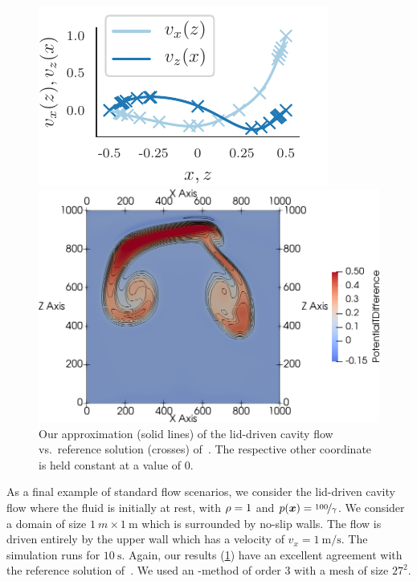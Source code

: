 \documentclass[runningheads]{llncs}
\begin{document}
\begin{figure}[tb]
\centering
  \begin{minipage}[t]{.473\textwidth}
    \centering
    \includegraphics{paper_lid_driven_cavity}
    \caption{\label{fig:cavity-flow}Our approximation (solid lines) of the lid-driven cavity flow vs.\ reference solution (crosses) of~\cite{ghia1982high}.
    The respective other coordinate is held constant at a value of 0.}
  \end{minipage}\quad%
\begin{minipage}[t]{.473\textwidth}
  \centering
    \includegraphics[width=\textwidth]{paper_two_bubbles_fv}
\end{minipage}
\end{figure}

As a final example of standard flow scenarios, we consider the lid-driven cavity flow where the fluid is initially at rest, with $\rho = 1$ and $ p(\bm{x}) = \nicefrac{100}{\gamma}$.
We consider a domain of size $\SI{1}{m} \times \SI{1}{\m}$ which is surrounded by no-slip walls.
The flow is driven entirely by the upper wall which has a velocity of $v_x = \SI{1}{\m/\s}$.
The simulation runs for $\SI{10}{\s}$.
Again, our results (\cref{fig:cavity-flow}) have an excellent agreement with the reference solution of~\cite{ghia1982high}.
We used an \aderdg{}-method of order $3$ with a mesh of size $27^2$.
\end{document}
